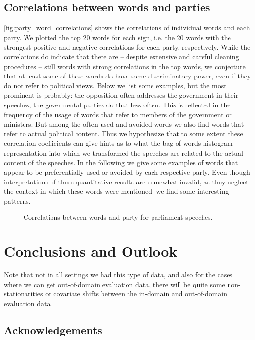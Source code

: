 \documentclass[runningheads,a4paper]{llncs}
\begin{document}
\subsection{Correlations between words and parties}\label{sec:word_party_correlations}

\autoref{fig:party_word_correlations} shows the correlations of individual words and each party. We plotted the top 20 words for each sign, i.e. the 20 words with the strongest positive and negative correlations for each party, respectively. While the correlations do indicate that there are -- despite extensive and careful cleaning procedures -- still words with strong correlations in the top words, we conjecture that at least some of these words do have some discriminatory power, even if they do not refer to political views. Below we list some examples, but the most prominent is probably: the opposition often addresses the government in their speeches, the govermental parties do that less often. This is reflected in the frequency of the usage of words that refer to members of the government or ministers. But among the often used and avoided words we also find words that refer to actual political content. Thus we hypothesize that to some extent these correlation coefficients can give hints as to what the bag-of-words histogram representation into which we transformed the speeches are related to the actual content of the speeches. In the following we give some examples of words that appear to be preferentially used or avoided by each respective party. Even though interpretations of these quantitative results are somewhat invalid, as they neglect the context in which these words were mentioned, we find some interesting patterns. 

\begin{figure}
\begin{center}
%
\end{center}
\caption{
\label{fig:party_word_correlations}
Correlations between words and party for parliament speeches. }
\end{figure}


\section{Conclusions and Outlook}\label{sec:conclusion}
Note that not in all settings we had this type of data, and also for the cases where we can get out-of-domain evaluation data, there will be quite some non-stationarities or covariate shifts between the in-domain and out-of-domain evaluation data. 


\small
\subsection*{Acknowledgements}

%
\small{

 
}
\end{document}
